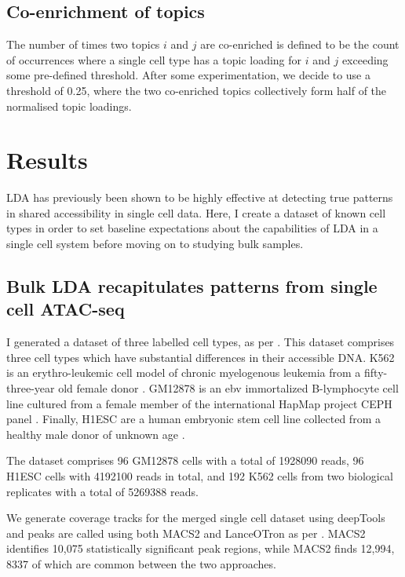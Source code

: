 \subsection{Co-enrichment of topics}

The number of times two topics $i$ and $j$ are co-enriched is defined to be the count of occurrences where a single cell type has a topic loading for $i$ and $j$ exceeding some pre-defined threshold. After some experimentation, we decide to use a threshold of 0.25, where the two co-enriched topics collectively form half of the normalised topic loadings. 

\section{Results} \label{ch4:results}

LDA has previously been shown to be highly effective at detecting true patterns in shared accessibility in single cell data. Here, I create a dataset of known cell types in order to set baseline expectations about the capabilities of LDA in a single cell system before moving on to studying bulk samples.

\subsection{Bulk LDA recapitulates patterns from single cell ATAC-seq}

I generated a dataset of three labelled cell types, as per . This dataset comprises three cell types which have substantial differences in their accessible DNA.  K562 is an erythro-leukemic cell model of chronic myelogenous leukemia from a fifty-three-year old female donor \cite{Lozzio1975}. GM12878 is an \gls{ebv} immortalized B-lymphocyte cell line cultured from a female member of the international HapMap project CEPH panel \cite{Belmont2005}. Finally, H1ESC are a human embryonic stem cell line collected from a healthy male donor of unknown age \cite{Thomson1998}. 

The dataset comprises 96 GM12878 cells with a total of 1928090 reads, 96 H1ESC cells with 4192100 reads in total, and 192 K562 cells from two biological replicates with a total of 5269388 reads.

We generate coverage tracks for the merged single cell dataset using deepTools and peaks are called using both MACS2 and LanceOTron as per  \cite{Ramirez2014}. MACS2 identifies 10,075 statistically significant peak regions, while MACS2 finds 12,994, 8337 of which are common between the two approaches.  

